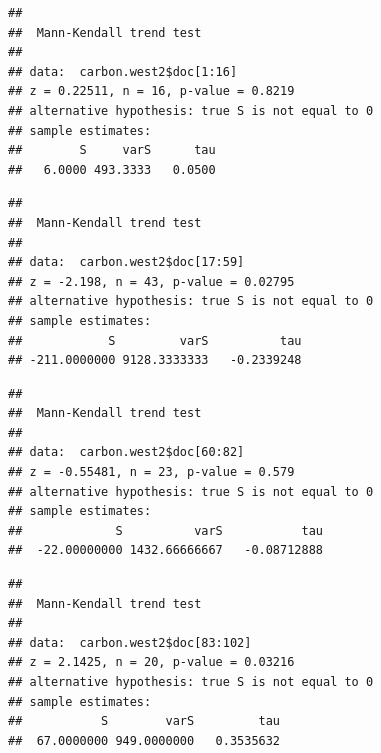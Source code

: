 \documentclass[12pt,]{article}
\newenvironment{Shaded}{\begin{snugshade}}{\end{snugshade}}
\newcommand{\KeywordTok}[1]{\textcolor[rgb]{0.13,0.29,0.53}{\textbf{#1}}}
\newcommand{\DecValTok}[1]{\textcolor[rgb]{0.00,0.00,0.81}{#1}}
\newcommand{\CommentTok}[1]{\textcolor[rgb]{0.56,0.35,0.01}{\textit{#1}}}
\newcommand{\OperatorTok}[1]{\textcolor[rgb]{0.81,0.36,0.00}{\textbf{#1}}}
\newcommand{\NormalTok}[1]{#1}
\begin{document}
\begin{verbatim}
## 
##  Mann-Kendall trend test
## 
## data:  carbon.west2$doc[1:16]
## z = 0.22511, n = 16, p-value = 0.8219
## alternative hypothesis: true S is not equal to 0
## sample estimates:
##        S     varS      tau 
##   6.0000 493.3333   0.0500
\end{verbatim}

\begin{Shaded}
\end{Shaded}

\begin{verbatim}
## 
##  Mann-Kendall trend test
## 
## data:  carbon.west2$doc[17:59]
## z = -2.198, n = 43, p-value = 0.02795
## alternative hypothesis: true S is not equal to 0
## sample estimates:
##            S         varS          tau 
## -211.0000000 9128.3333333   -0.2339248
\end{verbatim}

\begin{Shaded}
\end{Shaded}

\begin{verbatim}
## 
##  Mann-Kendall trend test
## 
## data:  carbon.west2$doc[60:82]
## z = -0.55481, n = 23, p-value = 0.579
## alternative hypothesis: true S is not equal to 0
## sample estimates:
##             S          varS           tau 
##  -22.00000000 1432.66666667   -0.08712888
\end{verbatim}

\begin{Shaded}
\end{Shaded}

\begin{verbatim}
## 
##  Mann-Kendall trend test
## 
## data:  carbon.west2$doc[83:102]
## z = 2.1425, n = 20, p-value = 0.03216
## alternative hypothesis: true S is not equal to 0
## sample estimates:
##           S        varS         tau 
##  67.0000000 949.0000000   0.3535632
\end{verbatim}
\end{document}
